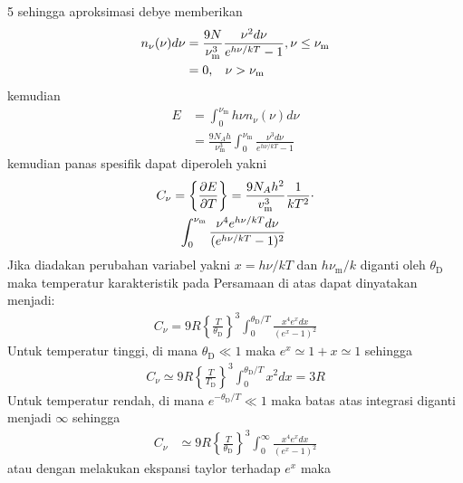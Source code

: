 \documentclass[a4paper  , 6 pt]{article}
\begin{document}
\begin{tiny}
\begin{multicols} {5}
 sehingga aproksimasi debye memberikan
 \begin{align}
 n_\nu (\nu) d\nu& = \frac{9N}{\nu_\mathrm{m}^3} \frac{\nu^2 d\nu}{e^{h\nu /kT} -  1} ,  \nu \le \nu_\mathrm{m} \nonumber \\
  & = 0,\hspace{0.3 cm}  \nu > \nu_\mathrm{m} \nonumber
 \end{align}
 kemudian 
 \begin{align}
 E & = \int_{0}^{\nu_\mathrm{m}}  h \nu n_\nu (\nu) d\nu  \nonumber \\
 & = \frac{9 N_A h}{\nu_\mathrm{m}^3} \int_{0}^{\nu_\mathrm{m}} \frac{\nu^3 d\nu}{e^{h\nu /kT} - 1} \nonumber
 \end{align}
 kemudian panas spesifik dapat diperoleh yakni
  \begin{align}
  C_\nu & = \left\lbrace \frac{\partial E}{\partial T} \right\rbrace   = \frac{9 N_A h^2}{v_\mathrm{m}^3} \frac{1}{kT^2} \cdot \nonumber \\ 
   & \hspace{0.2 cm }\int_{0}^{\nu_\mathrm{m}} \frac{\nu^4e^{h\nu /kT} d\nu }{(e^{h\nu /kT} - 1)^2} 
 \end{align}
 Jika diadakan perubahan variabel yakni $x = h\nu /kT$ dan $h\nu_\mathrm{m}/k $ diganti oleh $\theta_\mathrm{D}$ maka temperatur karakteristik pada Persamaan di atas dapat dinyatakan menjadi:
 \begin{align}
 C_\nu = 9 R \left \lbrace \frac{T}{\theta_\mathrm{D}} \right \rbrace^3 \int_{0}^{\theta_\mathrm{D}/T} \frac{x^4 e^x d x}{(e^x - 1)^2} \nonumber  
 \end{align}
 Untuk temperatur tinggi, di mana $\theta_\mathrm{D} \ll 1$ maka $e^x \simeq 1+ x \simeq 1 $ sehingga 
 \begin{align}
 C_\nu  \simeq 9 R \left\{ \frac{T}{T_\mathrm{D}} \right \}^3 \int_{0}^{\theta_\mathrm{D}/T} x^2 dx =  3 R \nonumber
 \end{align}
 Untuk temperatur rendah, di mana $e^{- \theta_\mathrm{D} /T}\ll 1$ maka batas atas integrasi diganti menjadi $\infty$ sehingga 
 \begin{align}
 C_\nu
 & \simeq 9 R
 \left\lbrace \frac{T}{\theta_\mathrm{D}}\right\rbrace^3
  \int_{0}^{\infty}
   \frac{x^4 e^x dx}{(e^x - 1)^2} \nonumber 
\end{align}
atau dengan melakukan ekspansi taylor terhadap $ e^x$ maka 

\end{multicols}
\end{tiny}
\end{document}
